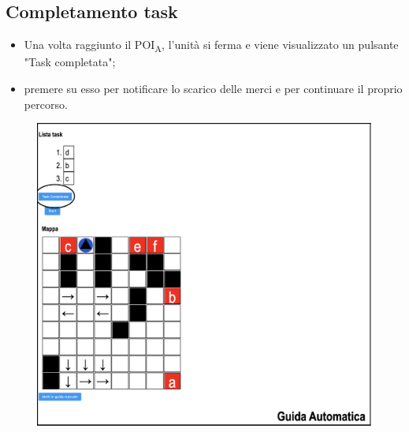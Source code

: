 \subsection{Completamento task}
\begin{itemize}
    \item Una volta raggiunto il POI\textsubscript{A}, l'unità si ferma e viene visualizzato un pulsante "Task completata";
    \item premere su esso per notificare lo scarico delle merci e per continuare il proprio percorso.
\end{itemize}
\begin{figure}[H]
    \centering
    \includegraphics[scale=0.45]{res/images/forklift_taskcompletata.png}
\end{figure}
\pagebreak
